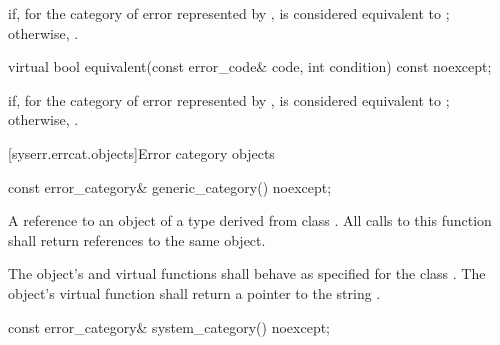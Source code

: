 \begin{itemdescr}
\pnum
\returns
{} if, for the category of error represented by ,  is considered equivalent to ; otherwise, .
\end{itemdescr}

%
\begin{itemdecl}
virtual bool equivalent(const error_code& code, int condition) const noexcept;
\end{itemdecl}

\begin{itemdescr}
\pnum
\returns
{} if, for the category of error represented by ,  is considered equivalent to ; otherwise, .
\end{itemdescr}

[syserr.errcat.objects]{Error category objects}

%
\begin{itemdecl}
const error_category& generic_category() noexcept;
\end{itemdecl}

\begin{itemdescr}
\pnum
\returns
A reference to an object of a type derived from class .
All calls to this function shall return references to the same object.

\pnum
\remarks
The object's  and  virtual functions shall behave as specified for the class . The object's  virtual function shall return a pointer to the string .
\end{itemdescr}

%
\begin{itemdecl}
const error_category& system_category() noexcept;
\end{itemdecl}

